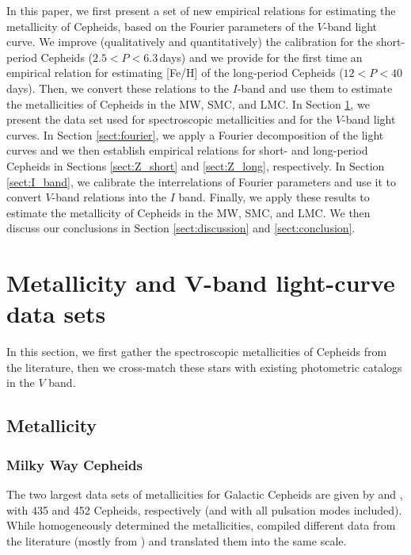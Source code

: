 \documentclass[article]{aa} %
\begin{document}
In this paper, we first present a set of new empirical relations for estimating the metallicity of Cepheids, based on the Fourier parameters of the $V$-band light curve. We improve (qualitatively and quantitatively) the calibration for the short-period Cepheids ($2.5<P<6.3\,$days) and we provide for the first time an empirical relation for estimating [Fe/H] of the long-period Cepheids ($12<P<40\,$days). Then, we convert these relations to the $I$-band and use them to estimate the metallicities of Cepheids in the MW, SMC, and LMC.
In Section \ref{sect:data_set}, we present the data set used for spectroscopic metallicities and for the $V$-band light curves. In Section \ref{sect:fourier}, we apply a Fourier decomposition of the light curves and we then establish empirical relations for short- and long-period Cepheids in Sections \ref{sect:Z_short} and \ref{sect:Z_long}, respectively. In Section \ref{sect:I_band}, we calibrate the interrelations of Fourier parameters and use it to convert $V$-band relations into the $I$ band. Finally, we apply these results to estimate the metallicity of Cepheids in the MW, SMC, and LMC. We then discuss our conclusions in Section \ref{sect:discussion} and \ref{sect:conclusion}.



\section{Metallicity and V-band light-curve data sets}\label{sect:data_set}
In this section, we first gather the spectroscopic metallicities of Cepheids from the literature, then we cross-match these stars with existing photometric catalogs in the $V$ band.



\subsection{Metallicity}\label{sect:data_set_Z}
\subsubsection{Milky Way Cepheids}
The two largest data sets of metallicities for Galactic Cepheids are given by \cite{Luck2018} and 
\cite{Groenewegen2018}, with 435 and 452 Cepheids, respectively (and with all pulsation modes included). While \cite{Luck2018} homogeneously determined  the metallicities, \cite{Groenewegen2018} compiled different data from the literature (mostly from \cite{Genovali2014,Genovali2015}) and translated them into the same scale.
\end{document}
